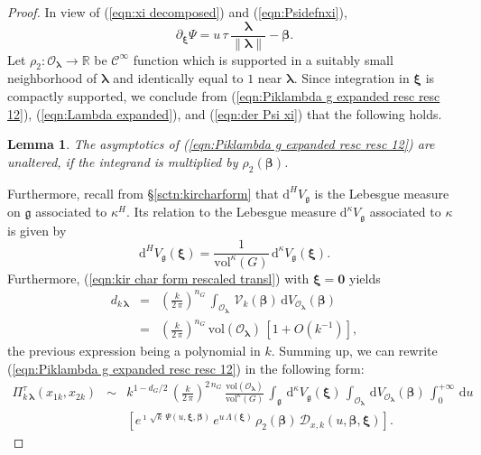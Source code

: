 \documentclass[12pt,a4paper]{article}
\theoremstyle{plain}
\newtheorem{lem}[thm]{Lemma}%
\theoremstyle{definition}
\begin{document}
\begin{proof}
In view of (\ref{eqn:xi decomposed}) and
(\ref{eqn:Psidefnxi}), 
\begin{equation}
\label{eqn:der Psi xi}
\partial_{\boldsymbol{\xi}}\Psi
=u\,\tau\,\frac{\boldsymbol{\lambda}}{\|\boldsymbol{\lambda}\|}
-\boldsymbol{\beta}.
\end{equation}  
%
Let $\rho_2:\mathcal{O}_{\boldsymbol{\lambda}}
\rightarrow \mathbb{R}$ be $\mathcal{C}^\infty$ function 
which is supported in a suitably small neighborhood
of $\boldsymbol{\lambda}$ and identically equal to
$1$ near $\boldsymbol{\lambda}$.
Since integration in $\boldsymbol{\xi}$ is compactly
supported, we conclude from 
(\ref{eqn:Piklambda g expanded resc resc 12}),
(\ref{eqn:Lambda expanded}), and (\ref{eqn:der Psi xi})
that the following holds.
%
\begin{lem}
\label{lem:reduction in beta}
The asymptotics of (\ref{eqn:Piklambda g expanded resc resc 12}) are unaltered, if the integrand is multiplied by
$\rho_2(\boldsymbol{\beta})$.
\end{lem}


Furthermore, recall from \S \ref{sctn:kircharform} that 
$\mathrm{d}^HV_{\mathfrak{g}}$ is the Lebesgue 
measure on $\mathfrak{g}$ associated to $\kappa^H$.
Its relation to the Lebesgue measure 
$\mathrm{d}^\kappa V_{\mathfrak{g}}$
associated to $\kappa$ 
is given by
$$
\mathrm{d}^HV_{\mathfrak{g}}(\boldsymbol{\xi})=
\frac{1}{\mathrm{vol}^\kappa (G)}\,
\mathrm{d}^\kappa V_{\mathfrak{g}}(\boldsymbol{\xi}).
$$
Furthermore, (\ref{eqn:kir char form rescaled transl}) with $\boldsymbol{\xi}=\mathbf{0}$
yields
\begin{eqnarray}
\label{eqn:kir char form rescaled transl 0}
d_{k\,\boldsymbol{\lambda}}
&=&\left(\frac{k}{2\,\pi}\right)^{n_G}\,
%
\int_{\mathcal{O}_{\boldsymbol{\lambda}}}
\,\mathcal{V}_k(\boldsymbol{\beta})\,
\mathrm{d}
V_{\mathcal{O}_{\boldsymbol{\lambda}}}
(\boldsymbol{\beta})\\
&=&\left(\frac{k}{2\,\pi}\right)^{n_G}\,
\mathrm{vol}(\mathcal{O}_{\boldsymbol{\lambda}})\,\left[1+O\left(k^{-1}\right)
\right],
\nonumber
\end{eqnarray}
the previous expression being a polynomial in $k$.
Summing up, we can rewrite 
(\ref{eqn:Piklambda g expanded resc resc 12})
in the following form:
\begin{eqnarray}
\label{eqn:Piklambda g expanded resc resc 123}
\Pi^\tau_{k\,\boldsymbol{\lambda}}(x_{1k},x_{2k})&\sim&
%
k^{1-d_G/2}\,
\left(\frac{k}{2\,\pi}\right)^{2\,n_G}\,\frac{\mathrm{vol}(\mathcal{O}_{\boldsymbol{\lambda}})}{\mathrm{vol}^\kappa (G)} \,
\int_{\mathfrak{g}}\,
\mathrm{d}^\kappa V_{\mathfrak{g}}(\boldsymbol{\xi})\,\int_{\mathcal{O}_{\boldsymbol{\lambda}}}\,
\mathrm{d}
V_{\mathcal{O}_{\boldsymbol{\lambda}}}(\boldsymbol{\beta})
\,\int_0^{+\infty}\,\mathrm{d}u
\nonumber
\\
&&\left[
 e^{\imath\,\sqrt{k}\,
\Psi
(u,\boldsymbol{\xi},\boldsymbol{\beta})
}\,e^{u\,\Lambda (\boldsymbol{\xi})}\,
\rho_2(\boldsymbol{\beta})\,
\mathcal{D}_{x,k}\left(u,\boldsymbol{\beta},\boldsymbol{\xi}\right)\right].
\end{eqnarray}


\end{proof}
\end{document}

